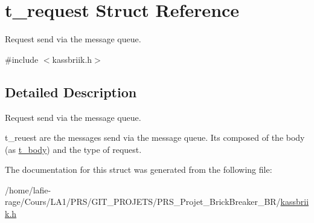 \hypertarget{structt__request}{}\section{t\+\_\+request Struct Reference}
\label{structt__request}


Request send via the message queue.  




{\ttfamily \#include $<$kassbriik.\+h$>$}



\subsection{Detailed Description}
Request send via the message queue. 

t\+\_\+reuest are the messages send via the message queue. It\textquotesingle{}s composed of the body (as \hyperlink{structt__body}{t\+\_\+body}) and the type of request. 

The documentation for this struct was generated from the following file\+:\begin{DoxyCompactItemize}
\item 
/home/lafie-\/rage/\+Cours/\+L\+A1/\+P\+R\+S/\+G\+I\+T\+\_\+\+P\+R\+O\+J\+E\+T\+S/\+P\+R\+S\+\_\+\+Projet\+\_\+\+Brick\+Breaker\+\_\+\+B\+R/\hyperlink{kassbriik_8h}{kassbriik.\+h}\end{DoxyCompactItemize}
